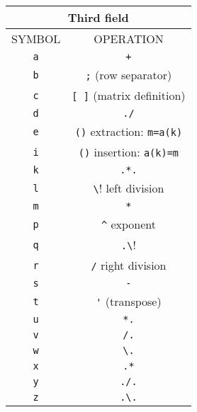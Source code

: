 \begin{center}
\begin{tabular}{|c|c|}
\hline 
\multicolumn{2}{|c|}{Third field}
\\ \hline \hline
SYMBOL & OPERATION 
\\ \hline \hline
\verb!a! & \verb!+!  \\ \hline

\verb!b! & \verb!;!  (row separator)\\ \hline

\verb!c! & \verb![ ]! (matrix definition) \\ \hline

\verb!d! & \verb!./!  \\ \hline

\verb!e! & \verb!()! extraction: \verb!m=a(k)!  \\ \hline

\verb!i! & \verb!()! insertion:  \verb!a(k)=m!  \\ \hline

\verb!k! & \verb!.*.!  \\ \hline

\verb!l! & \verb!\!  left division \\ \hline

\verb!m! & \verb!*!  \\ \hline

\verb!p! & \verb!^!  exponent \\ \hline

\verb!q! & \verb!.\!  \\ \hline

\verb!r! & \verb!/!  right division \\ \hline

\verb!s! & \verb!-!  \\ \hline

\verb!t! & \verb!'!  (transpose) \\ \hline

\verb!u! & \verb!*.!  \\ \hline

\verb!v! & \verb!/.!  \\ \hline

\verb!w! & \verb!\.!  \\ \hline

\verb!x! & \verb!.*!  \\ \hline

\verb!y! & \verb!./.!  \\ \hline

\verb!z! & \verb!.\.!  \\ \hline
\end{tabular}
\end{center}

